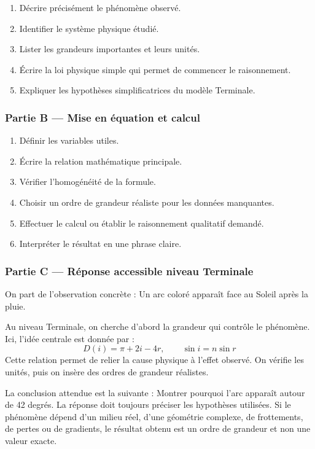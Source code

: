\documentclass[11pt,a4paper]{article}
\begin{document}
\begin{enumerate}
  \item Décrire précisément le phénomène observé.
  \item Identifier le système physique étudié.
  \item Lister les grandeurs importantes et leurs unités.
  \item Écrire la loi physique simple qui permet de commencer le raisonnement.
  \item Expliquer les hypothèses simplificatrices du modèle Terminale.
\end{enumerate}

\subsubsection*{Partie B — Mise en équation et calcul}

\begin{enumerate}
  \item Définir les variables utiles.
  \item Écrire la relation mathématique principale.
  \item Vérifier l'homogénéité de la formule.
  \item Choisir un ordre de grandeur réaliste pour les données manquantes.
  \item Effectuer le calcul ou établir le raisonnement qualitatif demandé.
  \item Interpréter le résultat en une phrase claire.
\end{enumerate}

\subsubsection*{Partie C — Réponse accessible niveau Terminale}

\begin{corrigebox}
On part de l'observation concrète : Un arc coloré apparaît face au Soleil après la pluie.

Au niveau Terminale, on cherche d'abord la grandeur qui contrôle le phénomène. Ici, l'idée centrale est donnée par :
\[
D(i)=\pi+2i-4r,\qquad \sin i=n\sin r
\]
Cette relation permet de relier la cause physique à l'effet observé. On vérifie les unités, puis on insère des ordres de grandeur réalistes.

La conclusion attendue est la suivante : Montrer pourquoi l'arc apparaît autour de 42 degrés. La réponse doit toujours préciser les hypothèses utilisées. Si le phénomène dépend d'un milieu réel, d'une géométrie complexe, de frottements, de pertes ou de gradients, le résultat obtenu est un ordre de grandeur et non une valeur exacte.
\end{corrigebox}
\end{document}
